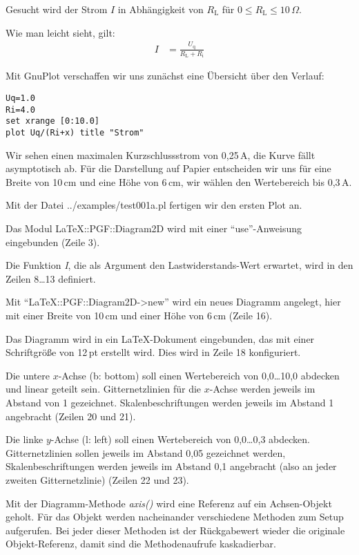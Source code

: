\documentclass[ngerman,origlongtable]{scrartcl}
\begin{document}
Gesucht wird der Strom \(I\) in Abhängigkeit von \(R_{\text{L}}\) für
\(0\leq R_{\text{L}}\leq 10\,\Omega\).

Wie man leicht sieht, gilt:
\begin{align*}I&=\frac{U_{\text{q}}}{R_{\text{L}}+R_{\text{i}}}\end{align*}

Mit GnuPlot verschaffen wir uns zunächst eine Übersicht über den Verlauf:
\begin{lstlisting}[language=GnuPlot]
Uq=1.0
Ri=4.0
set xrange [0:10.0]
plot Uq/(Ri+x) title "Strom"
\end{lstlisting}
Wir sehen einen maximalen Kurzschlussstrom von 0,25\,A, die Kurve fällt
asymptotisch ab. Für die Darstellung auf Papier entscheiden wir uns für
eine Breite von 10\,cm und eine Höhe von 6\,cm, wir wählen den Wertebereich
bis 0,3\,A.
\clearpage

Mit der Datei ../examples/test001a.pl fertigen wir den ersten Plot an.

Das Modul LaTeX::PGF::Diagram2D wird mit einer "`use"'-Anweisung eingebunden
(Zeile 3).

Die Funktion \textit{I}, die als Argument den Lastwiderstands-Wert
erwartet, wird in den Zeilen 8\ldots{}13 definiert.

Mit "`LaTeX::PGF::Diagram2D->new"' wird ein neues Diagramm angelegt, hier mit
einer Breite von 10\,cm und einer Höhe von 6\,cm (Zeile 16).

Das Diagramm wird in ein \LaTeX{}-Dokument eingebunden, das mit einer
Schriftgröße von 12\,pt erstellt wird. Dies wird in Zeile 18
konfiguriert.

Die untere \(x\)-Achse (b: bottom)
soll einen Wertebereich von 0,0\ldots{}10,0 abdecken
und linear geteilt sein. Gitternetzlinien für die \(x\)-Achse werden
jeweils im Abstand von 1 gezeichnet. Skalenbeschriftungen werden jeweils
im Abstand 1 angebracht (Zeilen 20 und 21).

Die linke \(y\)-Achse (l: left)
soll einen Wertebereich von 0,0\ldots{}0,3 abdecken.
Gitternetzlinien sollen jeweils im Abstand 0,05 gezeichnet werden,
Skalenbeschriftungen werden jeweils im Abstand 0,1 angebracht (also
an jeder zweiten Gitternetzlinie) (Zeilen 22 und 23).

Mit der Diagramm-Methode \textit{axis()\/} wird eine Referenz auf ein
Achsen-Objekt geholt. Für das Objekt werden nacheinander verschiedene
Methoden zum Setup aufgerufen. Bei jeder dieser Methoden ist der
Rückgabewert wieder die originale Objekt-Referenz, damit sind die
Methodenaufrufe kaskadierbar.
\end{document}
